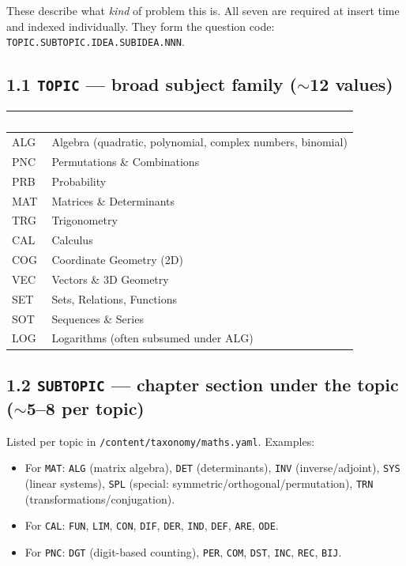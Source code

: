 \documentclass[11pt,letterpaper]{article}
\newcommand{\cd}[1]{\texttt{\small #1}}
\begin{document}
These describe what \emph{kind} of problem this is. All seven are required at insert time and indexed individually. They form the question code: \cd{TOPIC.SUBTOPIC.IDEA.SUBIDEA.NNN}.

\subsection*{1.1 \cd{TOPIC} --- broad subject family ($\sim$12 values)}

\begin{tabular}{|p{1.3cm}|p{14cm}|}
\hline
\rowcolor{headergray}\textcolor{white}{\textbf{Code}} & \textcolor{white}{\textbf{What it tags}} \\
\hline
ALG & Algebra (quadratic, polynomial, complex numbers, binomial) \\
\rowcolor{altrow}PNC & Permutations \& Combinations \\
PRB & Probability \\
\rowcolor{altrow}MAT & Matrices \& Determinants \\
TRG & Trigonometry \\
\rowcolor{altrow}CAL & Calculus \\
COG & Coordinate Geometry (2D) \\
\rowcolor{altrow}VEC & Vectors \& 3D Geometry \\
SET & Sets, Relations, Functions \\
\rowcolor{altrow}SOT & Sequences \& Series \\
LOG & Logarithms (often subsumed under ALG) \\
\hline
\end{tabular}

\subsection*{1.2 \cd{SUBTOPIC} --- chapter section under the topic ($\sim$5--8 per topic)}

Listed per topic in \cd{/content/taxonomy/maths.yaml}. Examples:
\begin{itemize}\itemsep0em
\item For \cd{MAT}: \cd{ALG} (matrix algebra), \cd{DET} (determinants), \cd{INV} (inverse/adjoint), \cd{SYS} (linear systems), \cd{SPL} (special: symmetric/orthogonal/permutation), \cd{TRN} (transformations/conjugation).
\item For \cd{CAL}: \cd{FUN}, \cd{LIM}, \cd{CON}, \cd{DIF}, \cd{DER}, \cd{IND}, \cd{DEF}, \cd{ARE}, \cd{ODE}.
\item For \cd{PNC}: \cd{DGT} (digit-based counting), \cd{PER}, \cd{COM}, \cd{DST}, \cd{INC}, \cd{REC}, \cd{BIJ}.
\end{itemize}
\end{document}
